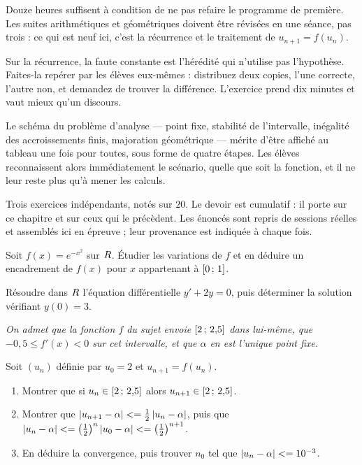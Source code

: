 \begin{notepourlaclasse}
Douze heures suffisent à condition de ne pas refaire le programme de
première. Les suites arithmétiques et géométriques doivent être révisées en
une séance, pas trois : ce qui est neuf ici, c'est la récurrence et le
traitement de $u_{n+1} = f(u_{n})$.

Sur la récurrence, la faute constante est l'hérédité qui n'utilise pas
l'hypothèse. Faites-la repérer par les élèves eux-mêmes : distribuez deux
copies, l'une correcte, l'autre non, et demandez de trouver la différence.
L'exercice prend dix minutes et vaut mieux qu'un discours.

Le schéma du problème d'analyse — point fixe, stabilité de l'intervalle,
inégalité des accroissements finis, majoration géométrique — mérite d'être
affiché au tableau une fois pour toutes, sous forme de quatre étapes. Les
élèves reconnaissent alors immédiatement le scénario, quelle que soit la
fonction, et il ne leur reste plus qu'à mener les calculs.
\end{notepourlaclasse}

\begin{devoir}[2 heures]
Trois exercices indépendants, notés sur $20$. Le devoir est cumulatif : il porte sur ce chapitre et sur ceux qui le précèdent. Les énoncés sont repris de sessions réelles et assemblés ici en épreuve ; leur provenance est indiquée à chaque fois.

Soit $f(x) = e^{-x^{2}}$ sur $R$. Étudier les variations de $f$ et en déduire
un encadrement de $f(x)$ pour $x$ appartenant à $\left[0\,;\,1\right]$.

Résoudre dans $R$ l'équation différentielle $y'+2y = 0$, puis déterminer la
solution vérifiant $y(0) = 3$.

\emph{On admet que la fonction $f$ du sujet envoie $\left[2\,;\,2{,}5\right]$
dans lui-même, que $-0{,}5 \leq f'(x) < 0$ sur cet intervalle, et que $\alpha$
en est l'unique point fixe.}

Soit $(u_{n})$ définie par $u_{0} = 2$ et $u_{n+1} = f(u_{n})$.
\begin{enumerate}[label=\textbf{\alph*)}, leftmargin=*, itemsep=0.15em]
  \item Montrer que si $u_{n} \in \left[2\,;\,2{,}5\right]$ alors
        $u_{n+1} \in \left[2\,;\,2{,}5\right]$.
  \item Montrer que $\left|u_{n+1}-\alpha\right| <= \frac12\left|u_{n}-\alpha\right|$,
        puis que $\left|u_{n}-\alpha\right| <=
        \left(\frac12\right)^{n}\left|u_{0}-\alpha\right| <=
        \left(\frac12\right)^{n+1}$.
  \item En déduire la convergence, puis trouver $n_{0}$ tel que
        $\left|u_{n}-\alpha\right| <= 10^{-3}$.
\end{enumerate}

\end{devoir}

